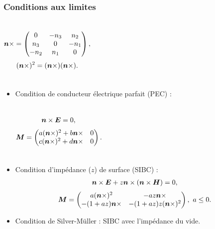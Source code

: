 \begin{frame}
\frametitle{Conditions aux limites}
\begin{columns}[c]
\begin{align*}
	\bm{n} \times =
	\begin{pmatrix}
		0 & -n_{3} & n_{2} \\
		n_{3} & 0 & -n_{1} \\
		-n_{2} & n_{1} & 0
	\end{pmatrix} ,
\end{align*}
\begin{align*}
	(\bm{n} \times)^2 = (\bm{n} \times)(\bm{n} \times) .
\end{align*}
\end{columns}
\vfill
\begin{itemize}
\item Condition de conducteur électrique parfait (PEC) :
\begin{columns}[c]
\begin{align*}
	\bm{n} \times \bm{E} = 0 , 
\end{align*}
\begin{align*}
	\bm{M} =
	\begin{pmatrix}
		a (\bm{n} \times)^2 + b \bm{n} \times & 0 \\
		c (\bm{n} \times)^2 + d \bm{n} \times & 0
	\end{pmatrix} .
\end{align*}
\end{columns}
\vfill
\item Condition d'impédance ($z$) de surface (SIBC) :
\begin{align*}
	\bm{n} \times \bm{E} + z \bm{n} \times (\bm{n} \times \bm{H}) = 0 , 
\end{align*}
\begin{align*}
	\bm{M} =
	\begin{pmatrix}
		a (\bm{n} \times)^2 & - a z \bm{n} \times \\
		- (1 + a z) \bm{n} \times & - (1 + a z) z (\bm{n} \times)^2
	\end{pmatrix} , \ a \le 0 .
\end{align*}
\vfill
\item Condition de Silver-Müller : SIBC avec l'impédance du vide.
\end{itemize}
\vfill
\end{frame}

